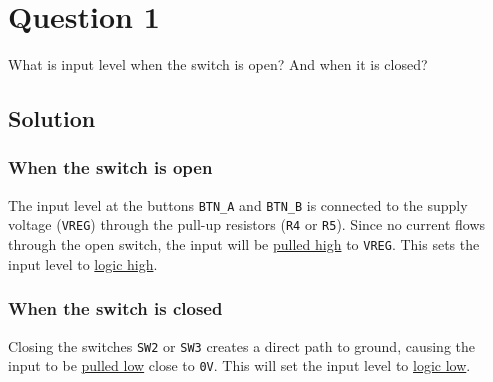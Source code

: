 \section*{Question 1}

What is input level when the switch is open?
And when it is closed?

\subsection*{Solution}

\subsubsection*{When the switch is open}

The input level at the buttons \texttt{BTN\_A} and \texttt{BTN\_B} is connected to the supply voltage (\texttt{VREG}) through the pull-up resistors (\texttt{R4} or \texttt{R5}).
Since no current flows through the open switch, the input will be \underline{pulled high} to \texttt{VREG}.
This sets the input level to \underline{logic high}.

\subsubsection*{When the switch is closed}

Closing the switches \texttt{SW2} or \texttt{SW3} creates a direct path to ground, causing the input to be \underline{pulled low} close to \texttt{0V}.
This will set the input level to \underline{logic low}.
